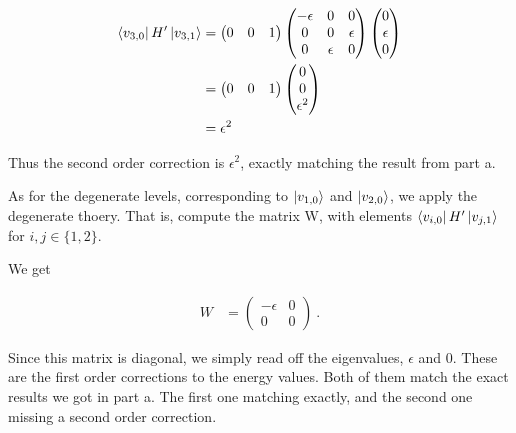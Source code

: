 \begin{alphaparts}
\begin{align}
    \bra{v_{3, 0}} H' \ket{v_{3, 1}} &= \begin{pmatrix}
        0 & 0 & 1
    \end{pmatrix}\begin{pmatrix}
        -\epsilon       & 0         & 0         \\
        0               & 0         & \epsilon  \\
        0               & \epsilon  & 0           
    \end{pmatrix}\begin{pmatrix}
        0 \\ \epsilon \\ 0
    \end{pmatrix}\nonumber\\
    &= \begin{pmatrix}
        0 & 0 & 1
    \end{pmatrix}\begin{pmatrix}
        0 \\ 0 \\ \epsilon^2
    \end{pmatrix}\nonumber\\
    &= \epsilon^2
\end{align}

Thus the second order correction is $\epsilon^2$, exactly matching the result
from part a.

\questionpart
As for the degenerate levels, corresponding to $\ket{v_{1, 0}}$ and $\ket{v_{2,
0}}$, we apply the degenerate thoery. That is, compute the matrix W, with
elements $\bra{v_{i, 0}} H' \ket{v_{j, 1}}$ for $i, j \in \{1, 2\}$. 

We get

\begin{align}
    W &= \begin{pmatrix}
        -\epsilon & 0\\
        0 & 0
    \end{pmatrix}~.
\end{align}

Since this matrix is diagonal, we simply read off the eigenvalues, $\epsilon$
and 0. These are the first order corrections to the energy values. Both of them
match the exact results we got in part a. The first one matching exactly, and
the second one missing a second order correction.

\end{alphaparts}